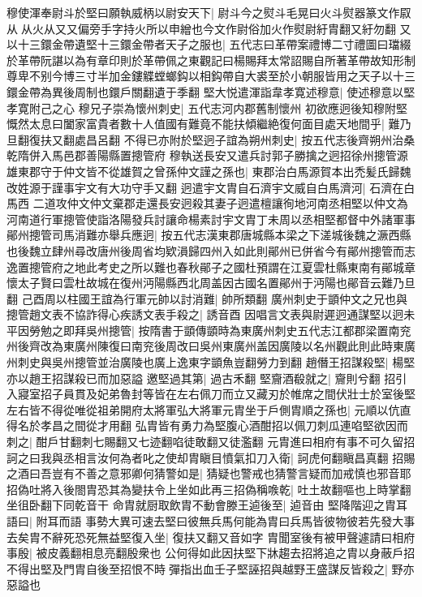 穆使渾奉尉斗於堅曰願執威柄以尉安天下|{
	尉斗今之熨斗毛晃曰火斗熨器篆文作叞从从火从又又偏旁手字持火所以申繒也今文作尉俗加火作熨尉紆胄翻又紆勿翻}
又以十三鐶金帶遺堅十三鐶金帶者天子之服也|{
	五代志曰革帶案禮博二寸禮圖曰璫綴於革帶阮諶以為有章印則於革帶佩之東觀記曰楊賜拜太常詔賜自所著革帶故知形制尊卑不别今博三寸半加金鏤䚢螳螂鈎以相鈎帶自大裘至於小朝服皆用之天子以十三鐶金帶為異後周制也鐶戶關翻遺于季翻}
堅大悦遣渾詣韋孝寛述穆意|{
	使述穆意以堅孝寛附己之心}
穆兄子崇為懷州刺史|{
	五代志河内郡舊制懷州}
初欲應迥後知穆附堅慨然太息曰闔家富貴者數十人值國有難竟不能扶傾繼絶復何面目處天地間乎|{
	難乃旦翻復扶又翻處昌呂翻}
不得已亦附於堅迥子誼為朔州刺史|{
	按五代志後齊朔州治桑乾隋併入馬邑郡善陽縣置摠管府}
穆執送長安又遣兵討郭子勝擒之迥招徐州摠管源雄東郡守于仲文皆不從雄賀之曾孫仲文謹之孫也|{
	東郡治白馬源賀本出禿髪氏歸魏改姓源于謹事宇文有大功守手又翻}
迥遣宇文胄自石濟宇文威自白馬濟河|{
	石濟在白馬西}
二道攻仲文仲文棄郡走還長安迥殺其妻子迥遣檀讓徇地河南丞相堅以仲文為河南道行軍摠管使詣洛陽發兵討讓命楊素討宇文胄丁未周以丞相堅都督中外諸軍事鄖州摠管司馬消難亦舉兵應迥|{
	按五代志漢東郡唐城縣本梁之下溠城後魏之㵐西縣也後魏立肆州尋改唐州後周省均欵溳歸四州入如此則鄖州已併省今有鄖州摠管而志逸置摠管府之地此考史之所以難也春秋鄖子之國杜預謂在江夏雲杜縣東南有鄖城章懷太子賢曰雲杜故城在復州沔陽縣西北周盖因古國名置鄖州于沔陽也鄖音云難乃旦翻}
己酉周以柱國王誼為行軍元帥以討消難|{
	帥所類翻}
廣州刺史于顗仲文之兄也與摠管趙文表不協詐得心疾誘文表手殺之|{
	誘音酉}
因唱言文表與尉遲迥通謀堅以迥未平因勞勉之即拜吳州摠管|{
	按隋書于顗傳顗時為東廣州刺史五代志江都郡梁置南兖州後齊改為東廣州陳復曰南兖後周改曰吳州東廣州盖因廣陵以名州觀此則此時東廣州刺史與吳州摠管並治廣陵也廣上逸東字顗魚豈翻勞力到翻}
趙僭王招謀殺堅|{
	楊堅亦以趙王招謀殺已而加惡謚}
邀堅過其第|{
	過古禾翻}
堅齎酒殽就之|{
	齎則兮翻}
招引入寢室招子員貫及妃弟魯封等皆在左右佩刀而立又藏刃於帷席之間伏壯士於室後堅左右皆不得從唯從祖弟開府太將軍弘大將軍元胄坐于戶側胄順之孫也|{
	元順以伉直得名於孝昌之間從才用翻}
弘胄皆有勇力為堅腹心酒酣招以佩刀刺瓜連啗堅欲因而刺之|{
	酣戶甘翻刺七賜翻又七迹翻啗徒敢翻又徒濫翻}
元胄進曰相府有事不可久留招訶之曰我與丞相言汝何為者叱之使却胄瞋目憤氣扣刀入衛|{
	訶虎何翻瞋昌真翻}
招賜之酒曰吾豈有不善之意邪卿何猜警如是|{
	猜疑也警戒也猜警言疑而加戒慎也邪音耶}
招偽吐將入後閤胄恐其為變扶令上坐如此再三招偽稱㗋乾|{
	吐土故翻嘔也上時掌翻坐徂卧翻下同乾音干}
命胄就厨取飲胄不動會滕王逌後至|{
	逌音由}
堅降階迎之胄耳語曰|{
	附耳而語}
事勢大異可速去堅曰彼無兵馬何能為胄曰兵馬皆彼物彼若先發大事去矣胄不辭死恐死無益堅復入坐|{
	復扶又翻又音如字}
胄聞室後有被甲聲遽請曰相府事殷|{
	被皮義翻相息亮翻殷衆也}
公何得如此因扶堅下牀趨去招將追之胄以身蔽戶招不得出堅及門胄自後至招恨不時彈指出血壬子堅誣招與越野王盛謀反皆殺之|{
	野亦惡謚也}
